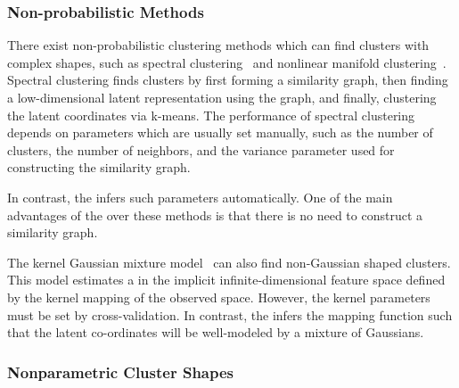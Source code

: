\subsubsection{Non-probabilistic Methods}

There exist non-probabilistic clustering methods which can find clusters with complex shapes, such as spectral clustering~\citep{ng2002spectral} and nonlinear manifold clustering~\citep{cao2006nonlinear,elhamifar2011sparse}.
Spectral clustering finds clusters by first forming a similarity graph, then finding a low-dimensional latent representation using the graph, and finally, clustering the latent coordinates via k-means.
The performance of spectral clustering depends on parameters which are usually set manually, such as the number of clusters, the number of neighbors, and the variance parameter used for constructing the similarity graph.

In contrast, the \iwmm{} infers such parameters automatically.
One of the main advantages of the \iwmm{} over these methods is that there is no need to construct a similarity graph.

The kernel Gaussian mixture model~\citep{wang2003kernel} can also find non-Gaussian shaped clusters.
This model estimates a \GMM{} in the implicit infinite-dimensional feature space defined by the kernel mapping of the observed space.
However, the kernel parameters must be set by cross-validation.
In contrast, the \iwmm{} infers the mapping function such that the latent co-ordinates will be well-modeled by a mixture of Gaussians.


\subsubsection{Nonparametric Cluster Shapes}

